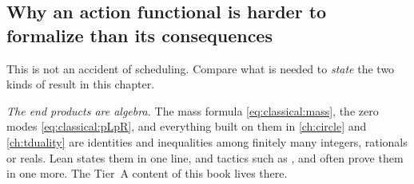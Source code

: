 \subsection{Why an action functional is harder to formalize than its consequences}

This is not an accident of scheduling. Compare what is needed to \emph{state} the two kinds
of result in this chapter.

\emph{The end products are algebra.} The mass formula \eqref{eq:classical:mass}, the zero
modes \eqref{eq:classical:pLpR}, and everything built on them in \cref{ch:circle} and
\cref{ch:tduality} are identities and inequalities among finitely many integers, rationals
or reals. Lean states them in one line, and tactics such as ,  and
 often prove them in one more. The Tier~A content of this book lives there.

